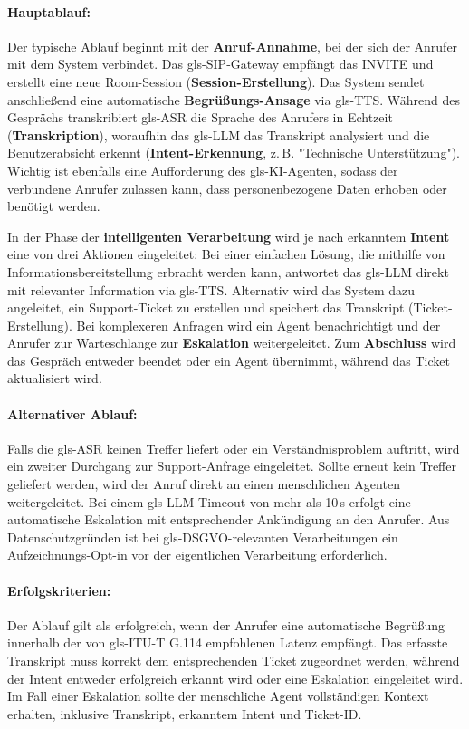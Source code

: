 \paragraph{Hauptablauf:}
Der typische Ablauf beginnt mit der \textbf{Anruf-Annahme}, bei der sich der Anrufer mit dem System verbindet. Das \gls{gls-SIP}-Gateway empfängt das INVITE und erstellt eine neue Room-Session (\textbf{Session-Erstellung}). Das System sendet anschlie\ss end eine automatische \textbf{Begrü\ss ungs-Ansage} via \gls{gls-TTS}. Während des Gesprächs transkribiert \gls{gls-ASR} die Sprache des Anrufers in Echtzeit (\textbf{Transkription}), woraufhin das \gls{gls-LLM} das Transkript analysiert und die Benutzerabsicht erkennt (\textbf{Intent-Erkennung}, z.\,B. "Technische Unterstützung"). Wichtig ist ebenfalls eine Aufforderung des \gls{gls-KI}-Agenten, sodass der verbundene Anrufer zulassen kann, dass personenbezogene Daten erhoben oder benötigt werden.

In der Phase der \textbf{intelligenten Verarbeitung} wird je nach erkanntem \textbf{Intent} eine von drei Aktionen eingeleitet: Bei einer einfachen Lösung, die mithilfe von Informationsbereitstellung erbracht werden kann, antwortet das \gls{gls-LLM} direkt mit relevanter Information via \gls{gls-TTS}. Alternativ wird das System dazu angeleitet, ein Support-Ticket zu erstellen und speichert das Transkript (Ticket-Erstellung). Bei komplexeren Anfragen wird ein Agent benachrichtigt und der Anrufer zur Warteschlange zur \textbf{Eskalation} weitergeleitet. Zum \textbf{Abschluss} wird das Gespräch entweder beendet oder ein Agent übernimmt, während das Ticket aktualisiert wird.

\paragraph{Alternativer Ablauf:}
Falls die \gls{gls-ASR} keinen Treffer liefert oder ein Verständnisproblem auftritt, wird ein zweiter Durchgang zur Support-Anfrage eingeleitet. Sollte erneut kein Treffer geliefert werden, wird der Anruf direkt an einen menschlichen Agenten weitergeleitet. Bei einem \gls{gls-LLM}-Timeout von mehr als 10\,s erfolgt eine automatische Eskalation mit entsprechender Ankündigung an den Anrufer. Aus Datenschutzgründen ist bei \gls{gls-DSGVO}-relevanten Verarbeitungen ein Aufzeichnungs-Opt-in vor der eigentlichen Verarbeitung erforderlich.

\paragraph{Erfolgskriterien:}
Der Ablauf gilt als erfolgreich, wenn der Anrufer eine automatische Begrü\ss ung innerhalb der von \gls{gls-ITU-T} G.114 empfohlenen Latenz empfängt. Das erfasste Transkript muss korrekt dem entsprechenden Ticket zugeordnet werden, während der Intent entweder erfolgreich erkannt wird oder eine Eskalation eingeleitet wird. Im Fall einer Eskalation sollte der menschliche Agent vollständigen Kontext erhalten, inklusive Transkript, erkanntem Intent und
Ticket-ID.

